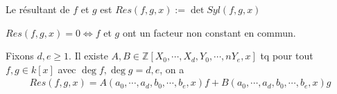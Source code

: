                 \begin{defi}
                    Le résultant de $f$ et $g$ est $Res(f,g,x) := \det Syl(f,g,x)$
                \end{defi}
                \begin{prop}
                    $Res(f,g,x) = 0 \iff f$ et $g$ ont un facteur non constant en commun.
                \end{prop}
                \begin{prop}
                    Fixons $d,e \geq 1$. Il existe $A,B \in \mathbb{Z}[X_0, \cdots, X_d, Y_0, \cdots,n Y_e, x]$ tq pour tout $f,g \in k[x]$ avec $\deg f , \deg g = d,e$, on a 
                    \begin{align*}
                        Res(f,g,x) = A(a_0, \cdots, a_d, b_0, \cdots, b_e, x) f +  B(a_0, \cdots, a_d, b_0, \cdots, b_e, x) g
                    \end{align*}
                \end{prop}
